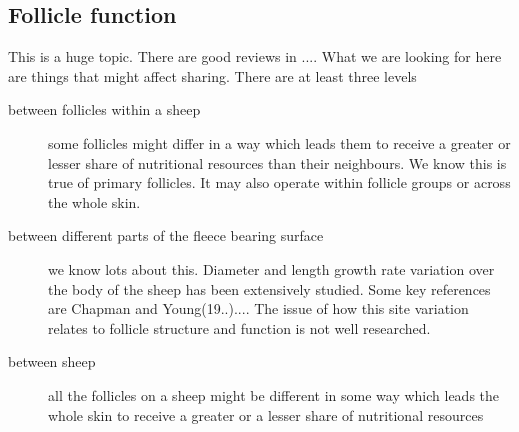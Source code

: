 \documentclass[titlepage]{article}  %
\begin{document}
\subsection{Follicle function}
This is a huge topic. There are good reviews in .... What we are looking for here are things that might affect sharing. There are at least three levels
\begin{description}
\item[between follicles within a sheep] some follicles might differ in a way which leads them to receive a greater or lesser share of nutritional resources than their neighbours. We know this is true of primary follicles. It may also operate within follicle groups or across the whole skin. 
\item[between different parts of the fleece bearing surface] we know lots about this. Diameter and length growth rate variation over the body of the sheep has been extensively studied. Some key references are Chapman and Young(19..).... The issue of how this site variation relates to follicle structure and function is not well researched.
\item[between sheep] all the follicles on a sheep might be different in some way which leads the whole skin to receive a greater or a lesser share of nutritional resources
\end{description}
\end{document}
